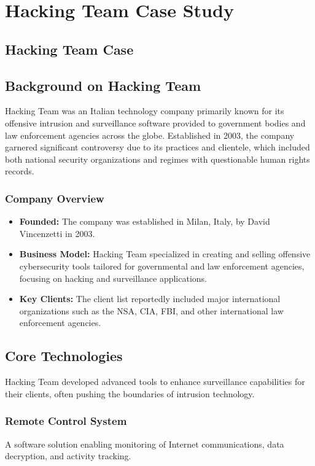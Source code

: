\chapter{Hacking Team Case Study}
\section{Hacking Team Case}

\section{Background on Hacking Team}
Hacking Team was an Italian technology company primarily known for its offensive intrusion and surveillance software provided to government bodies and law enforcement agencies across the globe. Established in 2003, the company garnered significant controversy due to its practices and clientele, which included both national security organizations and regimes with questionable human rights records.

\subsection{Company Overview}
\begin{itemize}
    \item \textbf{Founded:} The company was established in Milan, Italy, by David Vincenzetti in 2003.
    \item \textbf{Business Model:} Hacking Team specialized in creating and selling offensive cybersecurity tools tailored for governmental and law enforcement agencies, focusing on hacking and surveillance applications.
    \item \textbf{Key Clients:} The client list reportedly included major international organizations such as the NSA, CIA, FBI, and other international law enforcement agencies.
\end{itemize}

\section{Core Technologies}
Hacking Team developed advanced tools to enhance surveillance capabilities for their clients, often pushing the boundaries of intrusion technology.
\subsection{Remote Control System}
A software solution enabling monitoring of Internet communications, data decryption, and activity tracking.
